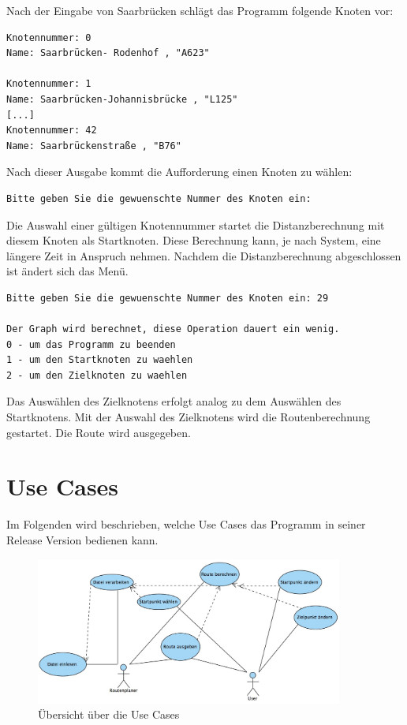 \documentclass[12pt, a4paper, ngerman]{article}
\begin{document}
Nach der Eingabe von Saarbrücken schlägt das Programm folgende Knoten vor:
\begin{lstlisting}
Knotennummer: 0
Name: Saarbrücken- Rodenhof , "A623"

Knotennummer: 1
Name: Saarbrücken-Johannisbrücke , "L125"
[...]
Knotennummer: 42
Name: Saarbrückenstraße , "B76"
\end{lstlisting} 
Nach dieser Ausgabe kommt die Aufforderung einen Knoten zu wählen:
\begin{lstlisting}
Bitte geben Sie die gewuenschte Nummer des Knoten ein:
\end{lstlisting}

Die Auswahl einer gültigen Knotennummer startet die Distanzberechnung mit diesem Knoten als Startknoten. Diese Berechnung kann, je nach System, eine längere Zeit in Anspruch nehmen. Nachdem die Distanzberechnung abgeschlossen ist ändert sich das Menü.
\begin{lstlisting}
Bitte geben Sie die gewuenschte Nummer des Knoten ein: 29

Der Graph wird berechnet, diese Operation dauert ein wenig.
0 - um das Programm zu beenden
1 - um den Startknoten zu waehlen
2 - um den Zielknoten zu waehlen
\end{lstlisting}


Das Auswählen des Zielknotens erfolgt analog zu dem Auswählen des Startknotens. Mit der Auswahl des Zielknotens wird die Routenberechnung gestartet. Die Route wird ausgegeben.
\section{Use Cases}
Im Folgenden wird beschrieben, welche Use Cases das Programm in seiner Release Version bedienen kann.

\begin{figure}[htbp] 
  \centering
     \includegraphics[width=0.9\textwidth]{Grafiken/primaryUseCases.jpg}
  \caption{Übersicht über die Use Cases}
  \label{fig:uebersichtUseCases}
\end{figure}
\end{document}
